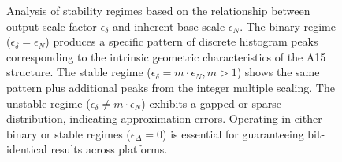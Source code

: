 \documentclass[10pt]{article}
\begin{document}
\begin{figure}[!ht]
\begin{tikzpicture}
    \end{tikzpicture}
    \caption{Analysis of stability regimes based on the relationship between output scale factor $\epsilon_\delta$ and inherent base scale $\epsilon_N$. The binary regime ($\epsilon_\delta = \epsilon_N$) produces a specific pattern of discrete histogram peaks corresponding to the intrinsic geometric characteristics of the A15 structure. The stable regime ($\epsilon_\delta = m \cdot \epsilon_N, m > 1$) shows the same pattern plus additional peaks from the integer multiple scaling. The unstable regime ($\epsilon_\delta \neq m \cdot \epsilon_N$) exhibits a gapped or sparse distribution, indicating approximation errors. Operating in either binary or stable regimes ($\epsilon_\Delta = 0$) is essential for guaranteeing bit-identical results across platforms.}
    \label{fig-stability-analysis}
\end{figure}
\end{document}
